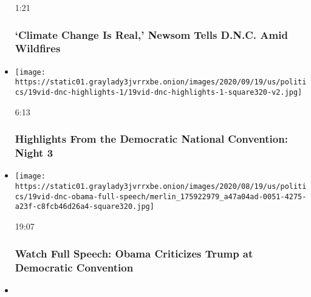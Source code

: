 \begin{itemize}
  1:21

  \hypertarget{climate-change-is-real-newsom-tells-dnc-amid-wildfires}{%
  \subsubsection{`Climate Change Is Real,' Newsom Tells D.N.C. Amid
  Wildfires}\label{climate-change-is-real-newsom-tells-dnc-amid-wildfires}}
\item
  \href{https://www.nytimes3xbfgragh.onion/video/us/politics/100000007297733/democratic-national-convention-highlights.html?action=click\&module=video-series-bar\&region=header\&pgtype=Article\&playlistId=video/2020-Elections}{}

  \texttt{[image: https://static01.graylady3jvrrxbe.onion/images/2020/09/19/us/politics/19vid-dnc-highlights-1/19vid-dnc-highlights-1-square320-v2.jpg]}

  6:13

  \hypertarget{highlights-from-the-democratic-national-convention-night-3}{%
  \subsubsection{Highlights From the Democratic National Convention:
  Night
  3}\label{highlights-from-the-democratic-national-convention-night-3}}
\item
  \href{https://www.nytimes3xbfgragh.onion/video/us/elections/100000007297653/barack-obama-full-speech-dnc.html?action=click\&module=video-series-bar\&region=header\&pgtype=Article\&playlistId=video/2020-Elections}{}

  \texttt{[image: https://static01.graylady3jvrrxbe.onion/images/2020/08/19/us/politics/19vid-dnc-obama-full-speech/merlin\_175922979\_a47a04ad-0051-4275-a23f-c8fcb46d26a4-square320.jpg]}

  19:07

  \hypertarget{watch-full-speech-obama-criticizes-trump-at-democratic-convention}{%
  \subsubsection{Watch Full Speech: Obama Criticizes Trump at Democratic
  Convention}\label{watch-full-speech-obama-criticizes-trump-at-democratic-convention}}
\item
  \href{https://www.nytimes3xbfgragh.onion/video/us/elections/100000007297654/kamala-harris-full-speech-dnc.html?action=click\&module=video-series-bar\&region=header\&pgtype=Article\&playlistId=video/2020-Elections}{}


\end{itemize}
